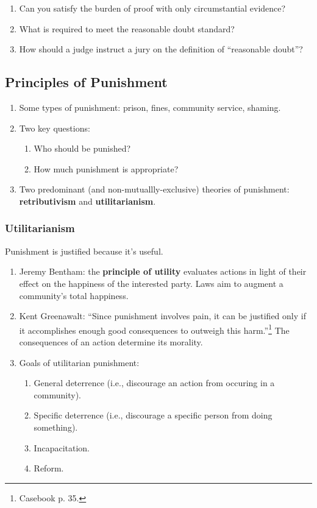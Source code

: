 \begin{enumerate}
    \item Can you satisfy the burden of proof with only circumstantial evidence?
    \item What is required to meet the reasonable doubt standard?
    \item How should a judge instruct a jury on the definition of ``reasonable doubt''?
\end{enumerate}

\subsection{Principles of Punishment}

\begin{enumerate}
    \item Some types of punishment: prison, fines, community service, shaming.
    \item Two key questions:
    \begin{enumerate}
        \item Who should be punished?
        \item How much punishment is appropriate?
    \end{enumerate}
    \item Two predominant (and non-mutuallly-exclusive) theories of punishment: \textbf{retributivism} and \textbf{utilitarianism}.
\end{enumerate}

\subsubsection{Utilitarianism}

Punishment is justified because it's useful.

\begin{enumerate}
    \item Jeremy Bentham: the \textbf{principle of utility} evaluates actions in light of their effect on the happiness of the interested party. Laws aim to augment a community's total happiness.
    \item Kent Greenawalt: ``Since punishment involves pain, it can be justified only if it accomplishes enough good consequences to outweigh this harm.''\footnote{Casebook p. 35.} The consequences of an action determine its morality.
    \item Goals of utilitarian punishment:
    \begin{enumerate}
        \item General deterrence (i.e., discourage an action from occuring in a community).
        \item Specific deterrence (i.e., discourage a specific person from doing something).
        \item Incapacitation.
        \item Reform.
    \end{enumerate}
\end{enumerate}


